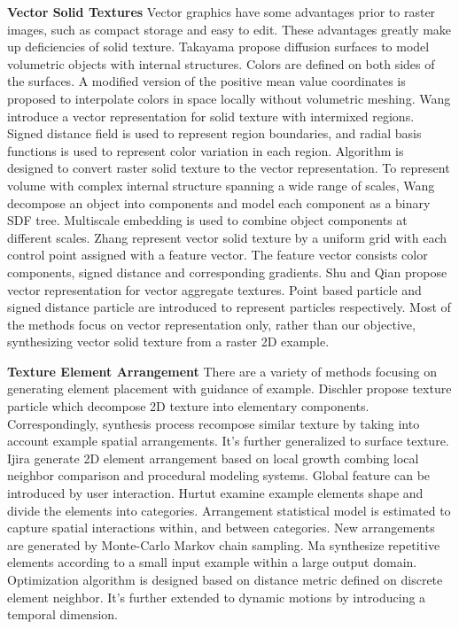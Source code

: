 \noindent
\textbf{Vector Solid Textures}
Vector graphics have some advantages prior to raster images, such as compact storage and easy to edit. These advantages greatly make up deficiencies of solid texture. Takayama \etal \cite{takayama2010volumetric} propose diffusion surfaces to model volumetric objects with internal structures. Colors are defined on both sides of the surfaces. A modified version of the positive mean value coordinates is proposed to interpolate colors in space locally without volumetric meshing. Wang \etal \cite{wang2010vector} introduce a vector representation for solid texture with intermixed regions. Signed distance field is used to represent region boundaries, and radial basis functions is used to represent color variation in each region. Algorithm is designed to convert raster solid texture to the vector representation. To represent volume with complex internal structure spanning a wide range of scales, Wang \etal \cite{wang2011multiscale} decompose an object into components and model each component as a binary SDF tree. Multiscale embedding is used to combine object components at different scales. Zhang \etal \cite{zhang2013efficient} represent vector solid texture by a uniform grid with  each control point assigned with a feature vector. The feature vector consists color components, signed distance and corresponding gradients. Shu \etal \cite{shu2014efficient} and Qian \etal \cite{qian2015vector} propose vector representation for vector aggregate textures. Point based particle and signed distance particle are introduced to represent particles respectively. Most of the methods focus on vector representation only, rather than our objective, \ie synthesizing vector solid texture from a raster 2D example.

\noindent
\textbf{Texture Element Arrangement}
There are a variety of methods focusing on generating element placement with guidance of example. Dischler \etal \cite{dischler2002texture} propose texture particle which decompose 2D texture into elementary components. Correspondingly, synthesis process recompose similar texture by taking into account example spatial arrangements. It's further generalized to surface texture. Ijira \etal \cite{ijiri2008example} generate 2D element arrangement based on local growth combing local neighbor comparison and procedural modeling systems. Global feature can be introduced by user interaction. Hurtut \etal \cite{hurtut2009appearance} examine example elements shape and divide the elements into categories. Arrangement statistical model is estimated to capture spatial interactions within, and between categories. New arrangements are generated by Monte-Carlo Markov chain sampling. Ma \etal \cite{ma2011discrete} synthesize repetitive elements according to a small input example within a large output domain. Optimization algorithm is designed based on distance metric defined on discrete element neighbor. It's further extended to dynamic motions\cite{ma2013dynamic} by introducing a temporal dimension.

